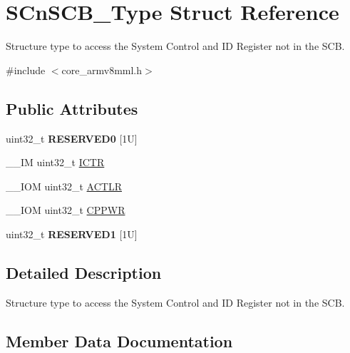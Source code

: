 \hypertarget{struct_s_cn_s_c_b___type}{}\section{S\+Cn\+S\+C\+B\+\_\+\+Type Struct Reference}
\label{struct_s_cn_s_c_b___type}


Structure type to access the System Control and ID Register not in the S\+CB.  




{\ttfamily \#include $<$core\+\_\+armv8mml.\+h$>$}

\subsection*{Public Attributes}
\begin{DoxyCompactItemize}
\item 
\mbox{\label{struct_s_cn_s_c_b___type_a758b3cae751b227e20698256b6249dd4}} 
uint32\+\_\+t {\bfseries R\+E\+S\+E\+R\+V\+E\+D0} \mbox{[}1\+U\mbox{]}
\item 
\+\_\+\+\_\+\+IM uint32\+\_\+t \mbox{\hyperlink{struct_s_cn_s_c_b___type_a34ec1d771245eb9bd0e3ec9336949762}{I\+C\+TR}}
\item 
\+\_\+\+\_\+\+I\+OM uint32\+\_\+t \mbox{\hyperlink{struct_s_cn_s_c_b___type_a13af9b718dde7481f1c0344f00593c23}{A\+C\+T\+LR}}
\item 
\+\_\+\+\_\+\+I\+OM uint32\+\_\+t \mbox{\hyperlink{struct_s_cn_s_c_b___type_a356efebfcbdaecaf1176e6cd86a60bf1}{C\+P\+P\+WR}}
\item 
\mbox{\label{struct_s_cn_s_c_b___type_a0bce3f86e9f6e00085cf5a126ae201c6}} 
uint32\+\_\+t {\bfseries R\+E\+S\+E\+R\+V\+E\+D1} \mbox{[}1\+U\mbox{]}
\end{DoxyCompactItemize}


\subsection{Detailed Description}
Structure type to access the System Control and ID Register not in the S\+CB. 

\subsection{Member Data Documentation}
\mbox{\label{struct_s_cn_s_c_b___type_a13af9b718dde7481f1c0344f00593c23}} 
